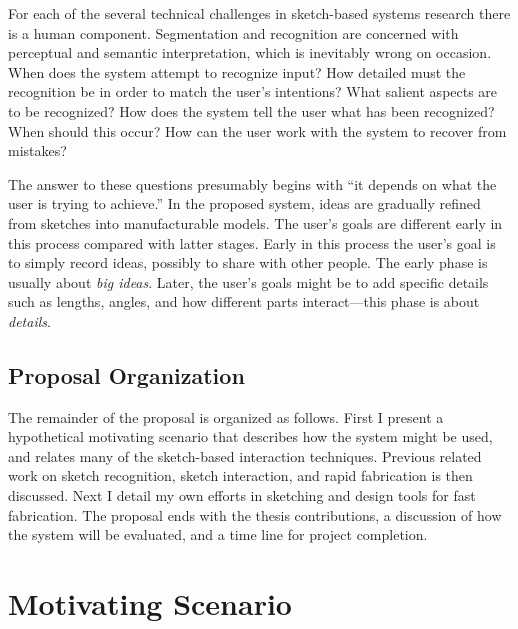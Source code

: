 \documentclass[12pt]{article}
\begin{document}
For each of the several technical challenges in sketch-based systems
research there is a human component. Segmentation and recognition are
concerned with perceptual and semantic interpretation, which is
inevitably wrong on occasion. When does the system attempt to
recognize input? How detailed must the recognition be in order to
match the user's intentions? What salient aspects are to be
recognized? How does the system tell the user what has been
recognized? When should this occur? How can the user work with the
system to recover from mistakes?

The answer to these questions presumably begins with ``it depends on
what the user is trying to achieve.'' In the proposed system, ideas
are gradually refined from sketches into manufacturable models. The
user's goals are different early in this process compared with latter
stages. Early in this process the user's goal is to simply record
ideas, possibly to share with other people. The early phase is usually
about \textit{big ideas}. Later, the user's goals might be to add
specific details such as lengths, angles, and how different parts
interact---this phase is about \textit{details}.

\subsection{Proposal Organization}

The remainder of the proposal is organized as follows. First I present
a hypothetical motivating scenario that describes how the system might
be used, and relates many of the sketch-based interaction
techniques. Previous related work on sketch recognition, sketch
interaction, and rapid fabrication is then discussed. Next I detail my
own efforts in sketching and design tools for fast fabrication. The
proposal ends with the thesis contributions, a discussion of how the
system will be evaluated, and a time line for project completion.

\section{Motivating Scenario}
\end{document}
